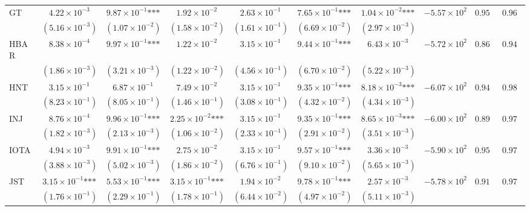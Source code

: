 \documentclass{article}
\begin{document}
\begin{landscape}
\begin{longtable}{lccccccccc}
GT & $4.22\times 10^{-3}$ & $9.87\times 10^{-1}\text{***}$ & $1.92\times 10^{-2}$ & $2.63\times 10^{-1}$ & $7.65\times 10^{-1}\text{***}$ & $1.04\times 10^{-2}\text{***}$ & $-5.57\times 10^{2}$ & $0.955$ & $0.965$ \\
 & $(5.16\times 10^{-3})$ & $(1.07\times 10^{-2})$ & $(1.58\times 10^{-2})$ & $(1.61\times 10^{-1})$ & $(6.69\times 10^{-2})$ & $(2.97\times 10^{-3})$ &  &  &  \\
HBAR & $8.38\times 10^{-4}$ & $9.97\times 10^{-1}\text{***}$ & $1.22\times 10^{-2}$ & $3.15\times 10^{-1}$ & $9.44\times 10^{-1}\text{***}$ & $6.43\times 10^{-3}$ & $-5.72\times 10^{2}$ & $0.866$ & $0.949$ \\
 & $(1.86\times 10^{-3})$ & $(3.21\times 10^{-3})$ & $(1.22\times 10^{-2})$ & $(4.56\times 10^{-1})$ & $(6.70\times 10^{-2})$ & $(5.22\times 10^{-3})$ &  &  &  \\
HNT & $3.15\times 10^{-1}$ & $6.87\times 10^{-1}$ & $7.49\times 10^{-2}$ & $3.15\times 10^{-1}$ & $9.35\times 10^{-1}\text{***}$ & $8.18\times 10^{-3}\text{***}$ & $-6.07\times 10^{2}$ & $0.944$ & $0.986$ \\
 & $(8.23\times 10^{-1})$ & $(8.05\times 10^{-1})$ & $(1.46\times 10^{-1})$ & $(3.08\times 10^{-1})$ & $(4.32\times 10^{-2})$ & $(4.34\times 10^{-3})$ &  &  &  \\
INJ & $8.76\times 10^{-4}$ & $9.96\times 10^{-1}\text{***}$ & $2.25\times 10^{-2}\text{***}$ & $3.15\times 10^{-1}$ & $9.35\times 10^{-1}\text{***}$ & $8.65\times 10^{-3}\text{***}$ & $-6.00\times 10^{2}$ & $0.891$ & $0.972$ \\
 & $(1.82\times 10^{-3})$ & $(2.13\times 10^{-3})$ & $(1.06\times 10^{-2})$ & $(2.33\times 10^{-1})$ & $(2.91\times 10^{-2})$ & $(3.51\times 10^{-3})$ &  &  &  \\
IOTA & $4.94\times 10^{-3}$ & $9.91\times 10^{-1}\text{***}$ & $2.75\times 10^{-2}$ & $3.15\times 10^{-1}$ & $9.57\times 10^{-1}\text{***}$ & $3.36\times 10^{-3}$ & $-5.90\times 10^{2}$ & $0.950$ & $0.972$ \\
 & $(3.88\times 10^{-3})$ & $(5.02\times 10^{-3})$ & $(1.86\times 10^{-2})$ & $(6.76\times 10^{-1})$ & $(9.10\times 10^{-2})$ & $(5.65\times 10^{-3})$ &  &  &  \\
JST & $3.15\times 10^{-1}\text{***}$ & $5.53\times 10^{-1}\text{***}$ & $3.15\times 10^{-1}\text{***}$ & $1.94\times 10^{-2}$ & $9.78\times 10^{-1}\text{***}$ & $2.57\times 10^{-3}$ & $-5.78\times 10^{2}$ & $0.913$ & $0.976$ \\
 & $(1.76\times 10^{-1})$ & $(2.29\times 10^{-1})$ & $(1.78\times 10^{-1})$ & $(6.44\times 10^{-2})$ & $(4.97\times 10^{-2})$ & $(5.11\times 10^{-3})$ &  &  &  \\

\end{longtable}
\end{landscape}
\end{document}
